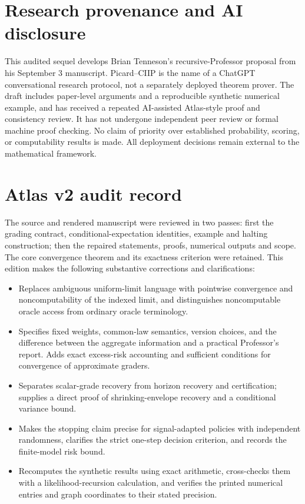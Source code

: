 \documentclass[11pt,letterpaper]{article}
\theoremstyle{definition}\newtheorem{definition}[theorem]{Definition}\newtheorem{example}[theorem]{Example}\newtheorem{conjecture}[theorem]{Conjecture}
\begin{document}
\clearpage
\section*{Research provenance and AI disclosure}
This audited sequel develops Brian Tenneson's recursive-Professor proposal from his September 3 manuscript. Picard--CIIP is the name of a ChatGPT conversational research protocol, not a separately deployed theorem prover. The draft includes paper-level arguments and a reproducible synthetic numerical example, and has received a repeated AI-assisted Atlas-style proof and consistency review. It has not undergone independent peer review or formal machine proof checking. No claim of priority over established probability, scoring, or computability results is made. All deployment decisions remain external to the mathematical framework.
\section*{Atlas v2 audit record}
The source and rendered manuscript were reviewed in two passes: first the grading contract, conditional-expectation identities, example and halting construction; then the repaired statements, proofs, numerical outputs and scope. The core convergence theorem and its exactness criterion were retained. This edition makes the following substantive corrections and clarifications:
\begin{itemize}
\item Replaces ambiguous uniform-limit language with pointwise convergence and noncomputability of the indexed limit, and distinguishes noncomputable oracle access from ordinary oracle terminology.
\item Specifies fixed weights, common-law semantics, version choices, and the difference between the aggregate information and a practical Professor's report. Adds exact excess-risk accounting and sufficient conditions for convergence of approximate graders.
\item Separates scalar-grade recovery from horizon recovery and certification; supplies a direct proof of shrinking-envelope recovery and a conditional variance bound.
\item Makes the stopping claim precise for signal-adapted policies with independent randomness, clarifies the strict one-step decision criterion, and records the finite-model risk bound.
\item Recomputes the synthetic results using exact arithmetic, cross-checks them with a likelihood-recursion calculation, and verifies the printed numerical entries and graph coordinates to their stated precision.
\end{itemize}
\end{document}
